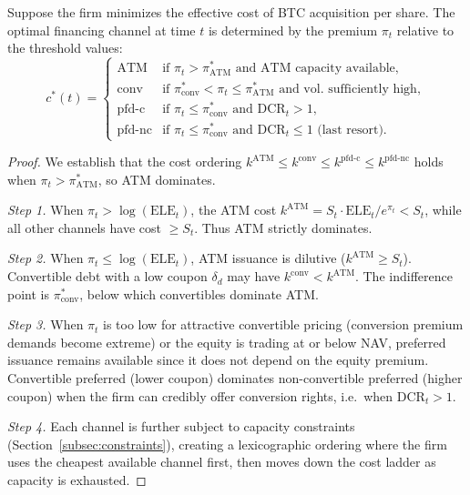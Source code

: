 \begin{theorem}\label{thm:optimal_channel}
Suppose the firm minimizes the effective cost of BTC acquisition per share.
The optimal financing channel at time $t$ is determined by the premium
$\pi_t$ relative to the threshold values:
\begin{equation}\label{eq:optimal_channel}
  c^*(t) =
  \begin{cases}
    \mathrm{ATM} & \text{if } \pi_t > \pi^*_{\mathrm{ATM}}
      \text{ and ATM capacity available}, \\[4pt]
    \mathrm{conv} & \text{if } \pi^*_{\mathrm{conv}} < \pi_t
      \le \pi^*_{\mathrm{ATM}}
      \text{ and vol.\ sufficiently high}, \\[4pt]
    \mathrm{pfd\text{-}c} & \text{if } \pi_t \le \pi^*_{\mathrm{conv}}
      \text{ and DCR}_t > 1, \\[4pt]
    \mathrm{pfd\text{-}nc} & \text{if } \pi_t \le \pi^*_{\mathrm{conv}}
      \text{ and DCR}_t \le 1 \text{ (last resort)}.
  \end{cases}
\end{equation}
\end{theorem}

\begin{proof}
We establish that the cost ordering
$k^{\mathrm{ATM}} \le k^{\mathrm{conv}} \le k^{\mathrm{pfd\text{-}c}}
\le k^{\mathrm{pfd\text{-}nc}}$ holds when $\pi_t > \pi^*_{\mathrm{ATM}}$,
so ATM dominates.

\emph{Step 1.}  When $\pi_t > \log(\mathrm{ELE}_t)$, the ATM cost
$k^{\mathrm{ATM}} = S_t \cdot \mathrm{ELE}_t / e^{\pi_t} < S_t$, while all
other channels have cost $\ge S_t$.  Thus ATM strictly dominates.

\emph{Step 2.}  When $\pi_t \le \log(\mathrm{ELE}_t)$, ATM issuance is
dilutive ($k^{\mathrm{ATM}} \ge S_t$).  Convertible debt with a low coupon
$\delta_d$ may have $k^{\mathrm{conv}} < k^{\mathrm{ATM}}$.  The indifference
point is $\pi^*_{\mathrm{conv}}$, below which convertibles dominate ATM.

\emph{Step 3.}  When $\pi_t$ is too low for attractive convertible pricing
(conversion premium demands become extreme) or the equity is trading at or
below NAV, preferred issuance remains available since it does not depend on
the equity premium.  Convertible preferred (lower coupon) dominates
non-convertible preferred (higher coupon) when the firm can credibly
offer conversion rights, i.e.\ when $\mathrm{DCR}_t > 1$.

\emph{Step 4.}  Each channel is further subject to capacity constraints
(Section~\ref{subsec:constraints}), creating a lexicographic ordering where
the firm uses the cheapest available channel first, then moves down the
cost ladder as capacity is exhausted.
\end{proof}

